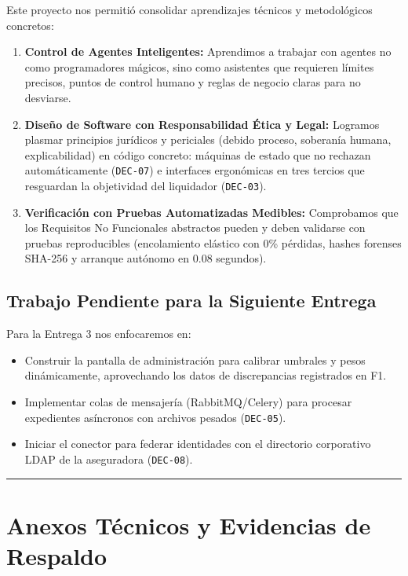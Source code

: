 \documentclass[11pt,letterpaper]{article}
\begin{document}
Este proyecto nos permitió consolidar aprendizajes técnicos y metodológicos concretos:
\begin{enumerate}
    \item \textbf{Control de Agentes Inteligentes:} Aprendimos a trabajar con agentes no como programadores mágicos, sino como asistentes que requieren límites precisos, puntos de control humano y reglas de negocio claras para no desviarse.
    \item \textbf{Diseño de Software con Responsabilidad Ética y Legal:} Logramos plasmar principios jurídicos y periciales (debido proceso, soberanía humana, explicabilidad) en código concreto: máquinas de estado que no rechazan automáticamente (\texttt{DEC-07}) e interfaces ergonómicas en tres tercios que resguardan la objetividad del liquidador (\texttt{DEC-03}).
    \item \textbf{Verificación con Pruebas Automatizadas Medibles:} Comprobamos que los Requisitos No Funcionales abstractos pueden y deben validarse con pruebas reproducibles (encolamiento elástico con 0\% pérdidas, hashes forenses SHA-256 y arranque autónomo en 0.08 segundos).
\end{enumerate}

\subsection{Trabajo Pendiente para la Siguiente Entrega}
Para la Entrega 3 nos enfocaremos en:
\begin{itemize}
    \item Construir la pantalla de administración para calibrar umbrales y pesos dinámicamente, aprovechando los datos de discrepancias registrados en F1.
    \item Implementar colas de mensajería (RabbitMQ/Celery) para procesar expedientes asíncronos con archivos pesados (\texttt{DEC-05}).
    \item Iniciar el conector para federar identidades con el directorio corporativo LDAP de la aseguradora (\texttt{DEC-08}).
\end{itemize}

\vspace{0.8em}
\noindent\rule{\textwidth}{1.2pt}

\newpage

\appendix
\section{Anexos Técnicos y Evidencias de Respaldo}
\end{document}
